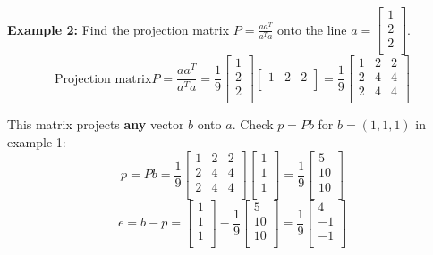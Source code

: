 \textbf{Example 2:} Find the projection matrix \(P = \frac{aa^T}{a^{T}a}\) onto the line \(a = \begin{bmatrix}
     1 \\
     2 \\
     2 \\
\end{bmatrix}\). 
\[
    \text{Projection matrix}
    P = \frac{aa^T}{a^{T}a} = \frac{1}{9}
    \begin{bmatrix}
         1 \\
         2 \\
         2 \\
    \end{bmatrix}
    \begin{bmatrix}
        1 & 2 & 2  \\
    \end{bmatrix}
    = \frac{1}{9}
    \begin{bmatrix}
        1 & 2 & 2  \\
        2 & 4 & 4  \\
        2 & 4 & 4  \\
    \end{bmatrix}
\]   

This matrix projects \textbf{any} vector \(b\) onto \(a\). Check \(p = Pb\) for \(b = (1, 1, 1)\) in example 1: 
\[
    p = Pb = \frac{1}{9}
    \begin{bmatrix}
        1 & 2 & 2  \\
        2 & 4 & 4  \\
        2 & 4 & 4  \\
    \end{bmatrix}
    \begin{bmatrix}
         1 \\
         1 \\
         1 \\
    \end{bmatrix}
    = 
    \frac{1}{9}
    \begin{bmatrix}
         5 \\
         10 \\
         10 \\
    \end{bmatrix}
\]    
\[
    e = b - p = \begin{bmatrix}
         1 \\
         1 \\
         1 \\
    \end{bmatrix}
    - \frac{1}{9}
    \begin{bmatrix}
         5 \\
         10 \\
         10 \\
    \end{bmatrix}
    = 
    \frac{1}{9}
    \begin{bmatrix}
         4 \\
         -1 \\
         -1 \\
    \end{bmatrix}
\]

